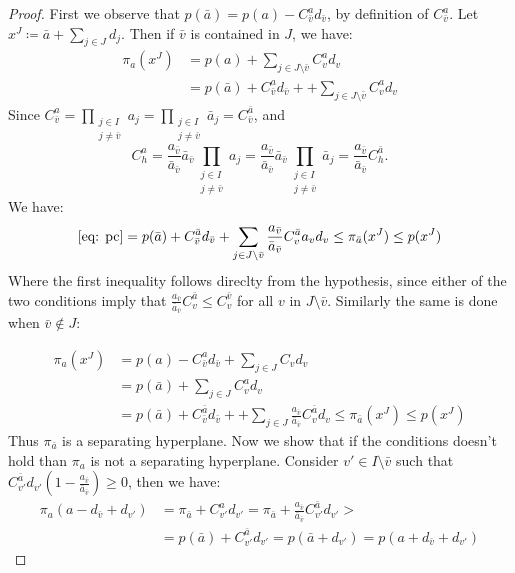 \documentclass{article}
\begin{document}
\begin{proof}
	First we observe that \(p(\bar{a}) = p(a) - C_{\bar{v}}^ad_{\bar{v}}\), by definition of \(C_{\bar{v}}^a\).
	 Let \(x^J \coloneqq \bar{a} + \sum_{j\in J}d_j\). Then if \(\bar{v}\) is contained in \(J\), we have:
\begin{align}
	\pi_a(x^J) &= p(a) + \sum_{j \in J \setminus{\bar{v}}} C_v^a  d_v\\
	&= p(\bar{a}) + C_{\bar{v}}^ad_{\bar{v}} +  + \sum_{j \in J \setminus{\bar{v}}} C_v^a  d_v \label{eq: pc}
\end{align}
Since \( C_{\bar{v}}^a = \prod_{\substack{j \in I \\ j \neq \bar{v}}}a_j = \prod_{\substack{j \in I \\ j \neq \bar{v}}}\bar{a}_j = C_{\bar{v}}^{\bar{a}}\), and 
 \[ C_{h}^a = \frac{a_{\bar{v}}}{\bar{a}_{\bar{v}}}\bar{a}_{\bar{v}}\prod_{\substack{j \in I \\ j \neq \bar{v}}}a_j = \frac{a_{\bar{v}}}{\bar{a}_{\bar{v}}}\bar{a}_{\bar{v}}\prod_{\substack{j \in I \\ j \neq \bar{v}}}\bar{a}_j =  \frac{a_{\bar{v}}}{\bar{a}_{\bar{v}}}C_{h}^{\bar{a}}.\]
 We have:
\begin{equation}
	\eqref{eq: pc} = p(\bar{a}) + C_{\bar{v}}^{\bar{a}}d_{\bar{v}} +   \sum_{j \in J \setminus{\bar{v}}}  \frac{a_{\bar{v}}}{\bar{a}_{\bar{v}}} C_v^{\bar{a}} a_v d_v \leq \pi_{\bar{a}}(x^J) \leq p(x^J)
\end{equation}
Where the first inequality follows direclty from the hypothesis, since either of the two conditions imply that \( \frac{a_{\bar{v}}}{\bar{a}_{\bar{v}}} C_v^{\bar{a}} \leq C_v^{\bar{v}}\) for all \(v\) in \(J\setminus{\bar{v}}\).
Similarly the same is done when \(\bar{v} \notin J\):

\begin{align}
	\pi_a(x^J) &= p(a) - C_{\bar{v}}^ad_{\bar{v}}  + \sum_{j \in J} C_v d_v \\
	&= p(\bar{a}) +  \sum_{j \in J } C_v^a d_v  \\
	&= p(\bar{a}) + C_{\bar{v}}^{\bar{a}}d_{\bar{v}} +  + \sum_{j \in J }  \frac{a_{\bar{v}}}{\bar{a}_{\bar{v}}} C_v^{\bar{a}} d_v \leq \pi_{\bar{a}}(x^J) \leq p(x^J)
\end{align}
Thus \(\pi_{\bar{a}}\) is a separating hyperplane. Now we show that if the conditions doesn't hold than \(\pi_a\) is not a separating hyperplane.
Consider \(v' \in I \setminus \bar{v}\) such that \(C_{v'}^{\bar{a}}d_{v'}(1 - \frac{a_{\bar{v}}}{\bar{a}_{\bar{v}}}) \geq 0\), then we have:
\begin{align}
\pi_a(a - d_{\bar{v}} + d_{v'}) &= \pi_{\bar{a}} + C_{v'}^{a}d_{v'} =  \pi_{\bar{a}} + \frac{a_{\bar{v}}}{\bar{a}_{\bar{v}}}C_{v'}^{\bar{a}}d_{v'} >
\\&= p(\bar{a}) + C_{v'}^{\bar{a}}d_{v'} = p(\bar{a} + d_{v'})= p(a + d_{\bar{v}}+ d_{v'})
\end{align} 
\end{proof}
\end{document}
